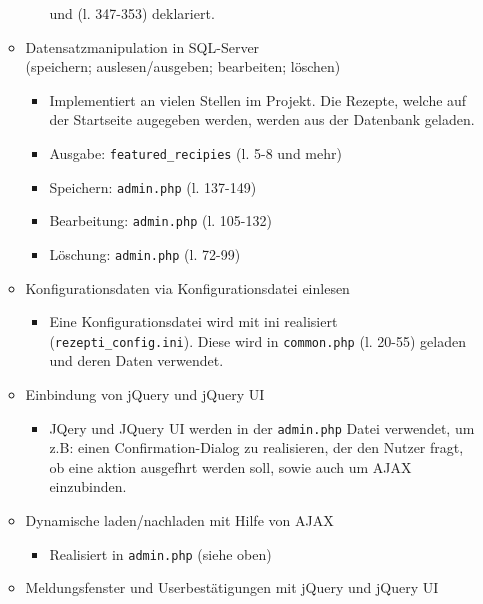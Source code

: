 \documentclass{article}
\begin{document}
\begin{itemize}
\begin{itemize}
\begin{itemize}
                    und (l. 347-353) deklariert.
            \end{itemize}
            \pagebreak
        \item Datensatzmanipulation in SQL-Server\\
            (speichern; auslesen/ausgeben; bearbeiten; löschen)
            \begin{itemize}
            \item Implementiert an vielen Stellen im Projekt. Die Rezepte, welche auf der 
                Startseite augegeben werden, werden aus der Datenbank geladen.
            \item Ausgabe: \verb|featured_recipies| (l. 5-8 und mehr)
            \item Speichern: \verb|admin.php| (l. 137-149)
            \item Bearbeitung: \verb|admin.php| (l. 105-132)
            \item Löschung: \verb|admin.php| (l. 72-99)
            \end{itemize}
        \item Konfigurationsdaten via Konfigurationsdatei einlesen
            \begin{itemize}
                \item Eine Konfigurationsdatei wird mit ini realisiert (\verb|rezepti_config.ini|).
                    Diese wird in \verb|common.php| (l. 20-55) geladen und deren Daten verwendet.
            \end{itemize}
        \item Einbindung von jQuery und jQuery UI\
            \begin{itemize}
                \item JQery und JQuery UI werden in der \verb|admin.php| Datei verwendet, 
                    um z.B: einen Confirmation-Dialog zu realisieren, der den Nutzer fragt, 
                    ob eine aktion ausgefhrt werden soll, sowie auch um AJAX einzubinden.
            \end{itemize}
        \item Dynamische laden/nachladen mit Hilfe von AJAX
            \begin{itemize}
                \item Realisiert in \verb|admin.php| (siehe oben)
            \end{itemize}
        \item Meldungsfenster und Userbestätigungen mit jQuery und jQuery UI
            \begin{itemize}

\end{itemize}
\end{itemize}
\end{itemize}
\end{document}
